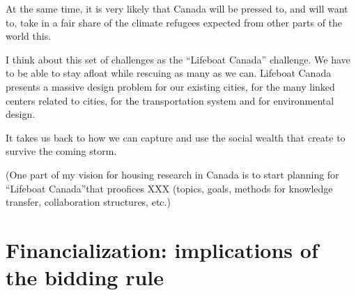  At the same time, it is very likely that Canada will be pressed to, and will want to, take in a fair share of the climate refugees expected from  other parts of the world this.

 I think about this  set of challenges as the ``Lifeboat Canada'' challenge. We have to be able to stay afloat while rescuing as many as we can. Lifeboat Canada presents a massive design problem  for our  existing cities, for the many linked centers related to cities, for the transportation system and for environmental design. 

 It takes us back to how we can capture and use the social wealth that create to survive the coming storm. 
 

  {\color{red}(One part of my vision for housing research in Canada  is to start planning for ``Lifeboat Canada''that proofices XXX (topics, goals, methods for knowledge transfer, collaboration structures, etc.)}
 
\section{Financialization: implications of the bidding rule}

